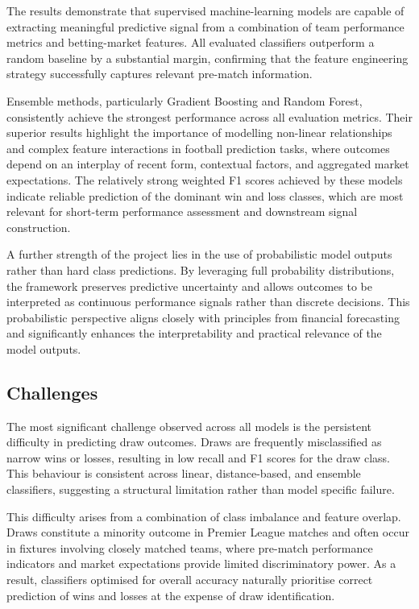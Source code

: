 \documentclass[11pt,a4paper]{article}
\begin{document}
The results demonstrate that supervised machine-learning models are capable of extracting meaningful predictive signal from a combination of team performance metrics and betting-market features. All evaluated classifiers outperform a random baseline by a substantial margin,
confirming that the feature engineering strategy successfully captures relevant pre-match information.

Ensemble methods, particularly Gradient Boosting and Random Forest, consistently achieve the strongest performance across all evaluation metrics. Their superior results highlight the importance of modelling non-linear relationships and complex feature interactions in football prediction tasks, where outcomes depend on an interplay of recent form, contextual factors,
and aggregated market expectations. The relatively strong weighted F1 scores achieved by these models indicate reliable prediction of the dominant win and loss classes, which are most relevant for short-term performance assessment and downstream signal construction.

A further strength of the project lies in the use of probabilistic model outputs rather than hard class predictions. By leveraging full probability distributions, the framework preserves predictive uncertainty and allows outcomes to be interpreted as continuous performance signals rather than discrete decisions. This probabilistic perspective aligns closely with principles from financial forecasting and significantly enhances the interpretability and practical relevance of the model outputs.

\subsection{Challenges}

The most significant challenge observed across all models is the persistent difficulty in predicting draw outcomes. Draws are frequently misclassified as narrow wins or losses, resulting in low recall and F1 scores for the draw class. This behaviour is consistent across linear, distance-based, and ensemble classifiers, suggesting a structural limitation rather than model specific failure.

This difficulty arises from a combination of class imbalance and feature overlap. Draws constitute a minority outcome in Premier League matches and often occur in fixtures involving closely matched teams, where pre-match performance indicators and market expectations provide limited discriminatory power. As a result, classifiers optimised for overall accuracy naturally prioritise correct prediction of wins and losses at the expense of draw identification.
\end{document}
